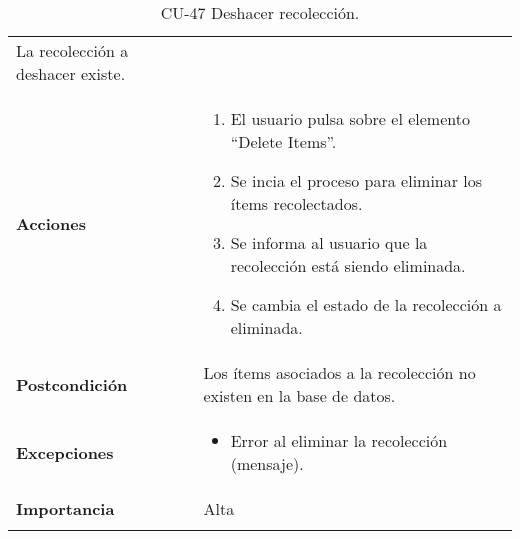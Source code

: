 \begin{longtable}[]{@{}ll@{}}
\begin{minipage}[t]{0.69\columnwidth}
La recolección a deshacer existe.\strut
\end{minipage}\tabularnewline
\begin{minipage}[t]{0.25\columnwidth}\raggedright
\textbf{Acciones}\strut
\end{minipage} & \begin{minipage}[t]{0.69\columnwidth}\raggedright
\begin{enumerate}
\def\labelenumi{\arabic{enumi}.}
\tightlist
\item
  El usuario pulsa sobre el elemento ``Delete Items''.
\item
  Se incia el proceso para eliminar los ítems recolectados.
\item
  Se informa al usuario que la recolección está siendo eliminada.
\item
  Se cambia el estado de la recolección a eliminada.
\end{enumerate}\strut
\end{minipage}\tabularnewline
\begin{minipage}[t]{0.25\columnwidth}\raggedright
\textbf{Postcondición}\strut
\end{minipage} & \begin{minipage}[t]{0.69\columnwidth}\raggedright
Los ítems asociados a la recolección no existen en la base de
datos.\strut
\end{minipage}\tabularnewline
\begin{minipage}[t]{0.25\columnwidth}\raggedright
\textbf{Excepciones}\strut
\end{minipage} & \begin{minipage}[t]{0.69\columnwidth}\raggedright
\begin{itemize}
\tightlist
\item
  Error al eliminar la recolección (mensaje).
\end{itemize}\strut
\end{minipage}\tabularnewline
\begin{minipage}[t]{0.25\columnwidth}\raggedright
\textbf{Importancia}\strut
\end{minipage} & \begin{minipage}[t]{0.69\columnwidth}\raggedright
Alta\strut
\end{minipage}\tabularnewline
\bottomrule
\caption{CU-47 Deshacer recolección.}
\end{longtable}

